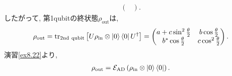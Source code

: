 \begin{ex}
\begin{align*}
\begin{pmatrix}
        \end{pmatrix}.
    \end{align*}
    したがって, 第1qubitの終状態$\rho_\mathrm{out}$は,
    \begin{align*}
        \rho_\mathrm{out}
        =
        \mathrm{tr}_\mathrm{2nd\ qubit} \left[U  \rho_\mathrm{in} \otimes \ket{0}\bra{0} U^\dagger\right]
        =
        \begin{pmatrix}
            a + c \sin^2 \frac{\theta}{2} & b \cos\frac{\theta}{2}   \\
            b^* \cos \frac{\theta}{2}     & c \cos^2\frac{\theta}{2}
        \end{pmatrix}.
    \end{align*}
    演習\ref{ex8.22}より,
    \begin{align*}
        \rho_\mathrm{out} = \mathcal{E}_\mathrm{AD}\left( \rho_\mathrm{in} \otimes \ket{0} \bra{0}\right).
    \end{align*}
\end{ex}

